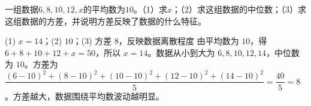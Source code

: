 \begin{question}[GPT生成]
一组数据$6,8,10,12,x$的平均数为$10$。（1）求$x$；（2）求这组数据的中位数；（3）求这组数据的方差，并说明方差反映了数据的什么特征。
\end{question}
\solutionSpace{5cm}
\begin{answer}{(1) $x=14$；(2) $10$；(3) 方差 $8$，反映数据离散程度}
由平均数为 $10$，得 $6+8+10+12+x=50$，所以 $x=14$。数据从小到大为 $6,8,10,12,14$，中位数为 $10$。方差为 $\dfrac{(6-10)^2+(8-10)^2+(10-10)^2+(12-10)^2+(14-10)^2}{5}=\dfrac{40}{5}=8$。方差越大，数据围绕平均数波动越明显。
\end{answer}

\printChapterAnswers
